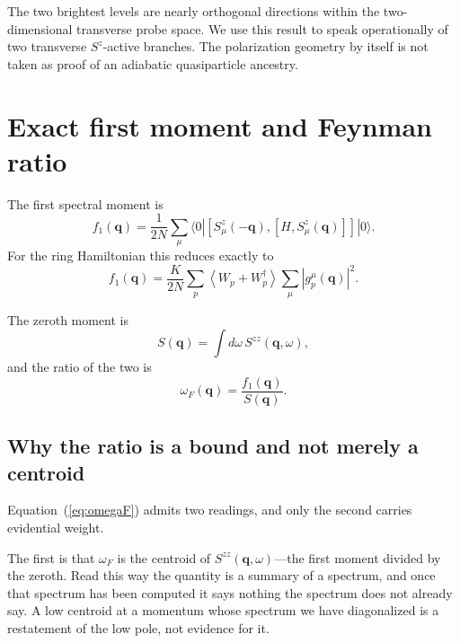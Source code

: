 \documentclass[
aps,
prl,
onecolumn,
amsmath,
amssymb,
superscriptaddress,
longbibliography
]{revtex4-2}
\newcommand{\bq}{\bm q}
\newcommand{\Szz}{S^{zz}}
\begin{document}
The two brightest levels are nearly orthogonal directions within the
two-dimensional transverse probe space.
We use this result to speak operationally of two transverse
$S^z$-active branches.
The polarization geometry by itself is not taken as proof of an
adiabatic quasiparticle ancestry.

\section{Exact first moment and Feynman ratio}
\label{sec:feynman}

The first spectral moment is
\begin{equation}
f_1(\bq)
=
\frac{1}{2N}
\sum_\mu
\langle0|
[
S_\mu^z(-\bq),
[
H,S_\mu^z(\bq)
]
]
|0\rangle .
\end{equation}
For the ring Hamiltonian this reduces exactly to
\begin{equation}
f_1(\bq)
=
\frac{K}{2N}
\sum_p
\left\langle
W_p+W_p^\dagger
\right\rangle
\sum_\mu
\left|
g_p^\mu(\bq)
\right|^2 .
\label{eq:f1_supp}
\end{equation}

The zeroth moment is
\begin{equation}
S(\bq)
=
\int d\omega\,
\Szz(\bq,\omega),
\end{equation}
and the ratio of the two is
\begin{equation}
\omega_F(\bq)
=
\frac{f_1(\bq)}{S(\bq)}.
\label{eq:omegaF}
\end{equation}

\subsection{Why the ratio is a bound and not merely a centroid}
\label{sec:why_bound}

Equation~(\ref{eq:omegaF}) admits two readings, and only the second
carries evidential weight.

The first is that $\omega_F$ is the centroid of
$\Szz(\bq,\omega)$---the first moment divided by the zeroth. Read this
way the quantity is a summary of a spectrum, and once that spectrum
has been computed it says nothing the spectrum does not already say. A
low centroid at a momentum whose spectrum we have diagonalized is a
restatement of the low pole, not evidence for it.
\end{document}
